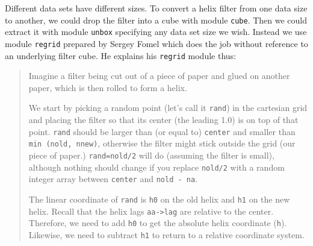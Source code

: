 \par
Different data sets have different sizes.
To convert a helix filter from one data size to another,
we could drop the filter into a cube with module \texttt{cube}.
Then we could extract it with module \texttt{unbox}
specifying any data set size we wish.
Instead we use module
\texttt{regrid} %
prepared by Sergey Fomel
which does the job without reference to an underlying filter cube.
He explains his \texttt{regrid} module thus:
        \begin{quotation}
        Imagine a filter being cut out of a piece of paper and
        glued on another paper, which is then rolled to form a helix.
\par            %
        We start by picking a random point (let's call it
        \texttt{rand}) in the
        cartesian grid and placing the filter so that its center
        (the leading 1.0) is on top of that point.
        \texttt{rand} should be larger than (or equal to)
        \texttt{center} and
        smaller than \texttt{min (nold, nnew)},
        otherwise the filter might stick outside the grid
        (our piece of paper.)
        \texttt{rand=nold/2} will do (assuming the filter is small),
        although nothing should change
        if you replace \texttt{nold/2} with a random integer array
        between \texttt{center} and \texttt{nold - na}.
\par
        The linear coordinate of \texttt{rand} is \texttt{h0}
        on the old helix and \texttt{h1} on the new helix.
        Recall that the helix lags \verb#aa->lag#
        are relative to the center.
        Therefore, we need to add \texttt{h0}
        to get the absolute helix coordinate (\texttt{h}).
        Likewise, we need to subtract \texttt{h1}
        to return to a relative coordinate system.
        \end{quotation}


%
%

%
%


\clearpage

